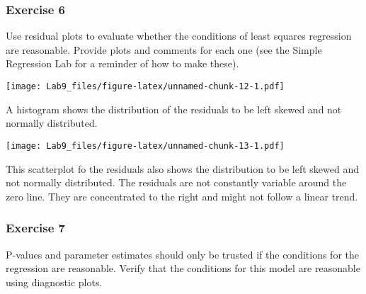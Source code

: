 \documentclass[
]{article}
\newenvironment{Shaded}{\begin{snugshade}}{\end{snugshade}}
\newcommand{\CommentTok}[1]{\textcolor[rgb]{0.56,0.35,0.01}{\textit{#1}}}
\newcommand{\DataTypeTok}[1]{\textcolor[rgb]{0.13,0.29,0.53}{#1}}
\newcommand{\DecValTok}[1]{\textcolor[rgb]{0.00,0.00,0.81}{#1}}
\newcommand{\KeywordTok}[1]{\textcolor[rgb]{0.13,0.29,0.53}{\textbf{#1}}}
\newcommand{\NormalTok}[1]{#1}
\newcommand{\OperatorTok}[1]{\textcolor[rgb]{0.81,0.36,0.00}{\textbf{#1}}}
\newcommand{\StringTok}[1]{\textcolor[rgb]{0.31,0.60,0.02}{#1}}
\begin{document}
\hypertarget{exercise-6}{%
\subsubsection{Exercise 6}\label{exercise-6}}

Use residual plots to evaluate whether the conditions of least squares
regression are reasonable. Provide plots and comments for each one (see
the Simple Regression Lab for a reminder of how to make these).

\begin{Shaded}
\end{Shaded}

\texttt{[image: Lab9\_files/figure-latex/unnamed-chunk-12-1.pdf]}

A histogram shows the distribution of the residuals to be left skewed
and not normally distributed.

\begin{Shaded}
\end{Shaded}

\texttt{[image: Lab9\_files/figure-latex/unnamed-chunk-13-1.pdf]}

This scatterplot fo the residuals also shows the distribution to be left
skewed and not normally distributed. The residuals are not constantly
variable around the zero line. They are concentrated to the right and
might not follow a linear trend.

\hypertarget{exercise-7}{%
\subsubsection{Exercise 7}\label{exercise-7}}

P-values and parameter estimates should only be trusted if the
conditions for the regression are reasonable. Verify that the conditions
for this model are reasonable using diagnostic plots.
\end{document}
